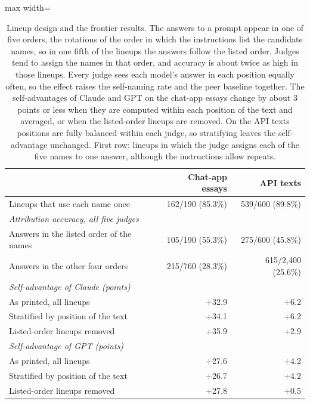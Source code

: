 \begin{table}[t]
\centering\small
\setlength\tabcolsep{5pt}
\begin{adjustbox}{max width=\linewidth}
\begin{tabular}{l rr}
\toprule
 & Chat-app essays & API texts \\
\midrule
Lineups that use each name once & 162/190 (85.3\%) & 539/600 (89.8\%) \\
\midrule
\multicolumn{3}{l}{\emph{Attribution accuracy, all five judges}} \\
\quad Answers in the listed order of the names & 105/190 (55.3\%) & 275/600 (45.8\%) \\
\quad Answers in the other four orders & 215/760 (28.3\%) & 615/2{,}400 (25.6\%) \\
\midrule
\multicolumn{3}{l}{\emph{Self-advantage of Claude (points)}} \\
\quad As printed, all lineups & +32.9 & +6.2 \\
\quad Stratified by position of the text & +34.1 & +6.2 \\
\quad Listed-order lineups removed & +35.9 & +2.9 \\
\midrule
\multicolumn{3}{l}{\emph{Self-advantage of GPT (points)}} \\
\quad As printed, all lineups & +27.6 & +4.2 \\
\quad Stratified by position of the text & +26.7 & +4.2 \\
\quad Listed-order lineups removed & +27.8 & +0.5 \\
\bottomrule
\end{tabular}
\end{adjustbox}
\caption{Lineup design and the frontier results. The answers to a prompt appear in one of five orders, the rotations of the order in which the instructions list the candidate names, so in one fifth of the lineups the answers follow the listed order. Judges tend to assign the names in that order, and accuracy is about twice as high in those lineups. Every judge sees each model's answer in each position equally often, so the effect raises the self-naming rate and the peer baseline together. The self-advantages of Claude and GPT on the chat-app essays change by about 3 points or less when they are computed within each position of the text and averaged, or when the listed-order lineups are removed. On the API texts positions are fully balanced within each judge, so stratifying leaves the self-advantage unchanged. First row: lineups in which the judge assigns each of the five names to one answer, although the instructions allow repeats.}
\label{tab:anchor}
\end{table}
